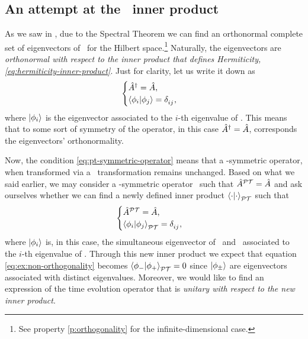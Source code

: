         \subsection{An attempt at the \PT\ inner product}
            As we saw in , due to the Spectral Theorem we can find an orthonormal complete set of eigenvectors of \hA\ for the Hilbert space.\footnote{See property \ref{p:orthogonality} for the infinite-dimensional case.} Naturally, the eigenvectors are \emph{orthonormal with respect to the inner product that defines Hermiticity, \eqref{eq:hermiticity-inner-product}}. Just for clarity, let us write it down as
            \begin{equation*}
                \begin{cases}
                    \hA^\dag = \hA
                    \mycomma \\
                    \braket{\phi_i}{\phi_j} = \tensor{\delta}{_i_j}
                    \mycomma
                \end{cases}
            \end{equation*}
            where $\ket{\phi_i}$ is the eigenvector associated to the $i$-th eigenvalue of \hA. This means that to some sort of symmetry of the operator, in this case $\hat{A}^\dag = \hat{A}$, corresponds the eigenvectors' orthonormality.

            Now, the condition \eqref{eq:pt-symmetric-operator} means that a \PT-symmetric operator, when transformed via a \PT\ transformation remains unchanged. Based on what we said earlier, we may consider a \PT-symmetric operator \hA\ such that $\hat{A}^{\mathcal{P}\mathcal{T}} = \hat{A}$ and ask ourselves whether we can find a newly defined inner product $\braket{\cdot}{\cdot}_{\mathcal{P}\mathcal{T}}$ such that
            \begin{equation*}
                \begin{cases}
                    \hA^{\PT} = \hA
                    \mycomma \\
                    \braket{\phi_i}{\phi_j}_{\PT} = \tensor{\delta}{_i_j}
                    \mycomma
                \end{cases}
            \end{equation*}
            where $\ket{\phi_i}$ is, in this case, the simultaneous eigenvector of \hA\ and \hPT\ associated to the $i$-th eigenvalue of \hA. Through this new inner product we expect that equation \eqref{eq:ex:non-orthogonality} becomes $\braket{\phi_-}{\phi_+}_{\mathcal{P}\mathcal{T}} = 0$ since $\ket{\phi_\pm}$ are eigenvectors associated with distinct eigenvalues. Moreover, we would like to find an expression of the time evolution operator that is \emph{unitary with respect to the new inner product}.

